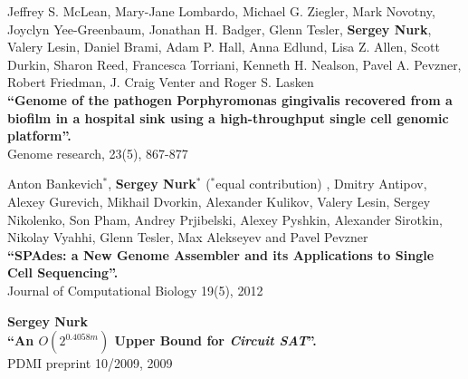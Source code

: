 \begin{outerlist}
\item Jeffrey S. McLean, Mary-Jane Lombardo, Michael G. Ziegler, Mark Novotny, Joyclyn Yee-Greenbaum, Jonathan H. Badger, Glenn Tesler, \textbf{Sergey Nurk}, Valery Lesin, Daniel Brami, Adam P. Hall, Anna Edlund, Lisa Z. Allen, Scott Durkin, Sharon Reed, Francesca Torriani, Kenneth H. Nealson, Pavel A. Pevzner, Robert Friedman, J. Craig Venter and Roger S. Lasken \\
\textbf{``Genome of the pathogen Porphyromonas gingivalis recovered from a biofilm in a hospital sink using a high-throughput single cell genomic platform''.} \\
Genome research, 23(5), 867-877

\item Anton Bankevich$^*$, \textbf{Sergey Nurk}$^*$ ($^*$equal contribution)%
, Dmitry Antipov, Alexey Gurevich, Mikhail Dvorkin, Alexander Kulikov, Valery Lesin, Sergey Nikolenko, Son Pham, Andrey Prjibelski, Alexey Pyshkin, Alexander Sirotkin, Nikolay Vyahhi, Glenn Tesler, Max Alekseyev and Pavel Pevzner \\
\textbf{``SPAdes: a New Genome Assembler and its Applications to Single Cell Sequencing''.}\\
Journal of Computational Biology 19(5), 2012

\item \textbf{Sergey Nurk} \\
\textbf{``An $O(2^{0.4058m})$ Upper Bound for \textit{Circuit SAT}''.}\\
PDMI preprint 10/2009, 2009


\end{outerlist}

